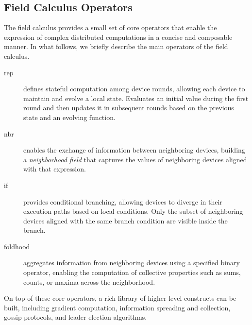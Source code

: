 \documentclass[runningheads]{llncs}
\newcommand{\outline}[1]{%
  \textcolor{blue}{\textit{Outline: #1}}%
}
\begin{document}
\subsection{Field Calculus Operators}\label{sec:fc-operators}
The field calculus provides a small set of core operators that enable the expression of complex distributed computations in a concise and composable manner.
%
In what follows, we briefly describe the main operators of the field calculus.

\begin{description}
    \item[rep] defines stateful computation among device rounds, allowing each device to maintain and evolve a local state.
        Evaluates an initial value during the first round and then updates it in subsequent rounds based on the previous state and an evolving function.
    \item[nbr] enables the exchange of information between neighboring devices, building a \emph{neighborhood field} that captures the values of neighboring devices aligned with that expression.
    \item[if] provides conditional branching, allowing devices to diverge in their execution paths based on local conditions.
        Only the subset of neighboring devices aligned with the same branch condition are visible inside the branch.
    \item[foldhood] aggregates information from neighboring devices using a specified binary operator, 
        enabling the computation of collective properties such as sums, counts, or maxima across the neighborhood.
\end{description}

On top of these core operators, 
 a rich library of higher-level constructs can be built, 
 including gradient computation, 
 information spreading and collection, 
 gossip protocols, 
 and leader election algorithms.
\end{document}

